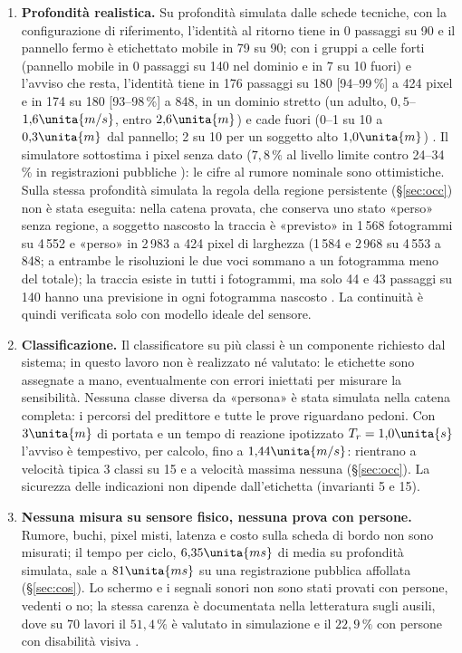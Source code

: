 \begin{enumerate}[label=\arabic*.,ref=\arabic*,leftmargin=1.8em]
\item \textbf{Profondità realistica.} Su profondità simulata dalle schede tecniche, con la configurazione di riferimento, l'identità al ritorno tiene in 0 passaggi su 90 e il pannello fermo è etichettato mobile in 79 su 90; con i gruppi a celle forti (pannello mobile in 0 passaggi su 140 nel dominio e in 7 su 10 fuori) e l'avviso che resta, l'identità tiene in 176 passaggi su 180 [94--99\,\%] a 424 pixel e in 174 su 180 [93--98\,\%] a 848, in un dominio stretto (un adulto, $0{,}5$--$1{,}6\unita{m/s}$, entro $2{,}6\unita{m}$) e cade fuori (0--1 su 10 a $0{,}3\unita{m}$ dal pannello; 2 su 10 per un soggetto alto $1{,}0\unita{m}$) . Il simulatore sottostima i pixel senza dato ($7{,}8\,\%$ al livello limite contro 24--34\,\% in registrazioni pubbliche ): le cifre al rumore nominale sono ottimistiche. Sulla stessa profondità simulata la regola della regione persistente (\S\ref{sec:occ}) non è stata eseguita: nella catena provata, che conserva uno stato «perso» senza regione, a soggetto nascosto la traccia è «previsto» in 1\,568 fotogrammi su 4\,552 e «perso» in 2\,983 a 424 pixel di larghezza (1\,584 e 2\,968 su 4\,553 a 848; a entrambe le risoluzioni le due voci sommano a un fotogramma meno del totale); la traccia esiste in tutti i fotogrammi, ma solo 44 e 43 passaggi su 140 hanno una previsione in ogni fotogramma nascosto . La continuità è quindi verificata solo con modello ideale del sensore.
\item \textbf{Classificazione.} Il classificatore su più classi è un componente richiesto dal sistema; in questo lavoro non è realizzato né valutato: le etichette sono assegnate a mano, eventualmente con errori iniettati per misurare la sensibilità. Nessuna classe diversa da «persona» è stata simulata nella catena completa: i percorsi del predittore e tutte le prove riguardano pedoni. Con $3\unita{m}$ di portata e un tempo di reazione ipotizzato $T_r=1{,}0\unita{s}$ l'avviso è tempestivo, per calcolo, fino a $1{,}44\unita{m/s}$: rientrano a velocità tipica 3 classi su 15 e a velocità massima nessuna  (\S\ref{sec:occ}). La sicurezza delle indicazioni non dipende dall'etichetta (invarianti 5 e 15).
\item \textbf{Nessuna misura su sensore fisico, nessuna prova con persone.} Rumore, buchi, pixel misti, latenza e costo sulla scheda di bordo non sono misurati; il tempo per ciclo, $6{,}35\unita{ms}$ di media su profondità simulata, sale a $81\unita{ms}$ su una registrazione pubblica affollata  (\S\ref{sec:cos}). Lo schermo e i segnali sonori non sono stati provati con persone, vedenti o no; la stessa carenza è documentata nella letteratura sugli ausili, dove su 70 lavori il $51{,}4\,\%$ è valutato in simulazione e il $22{,}9\,\%$ con persone con disabilità visiva \cite{romlay2021}.
\end{enumerate}

